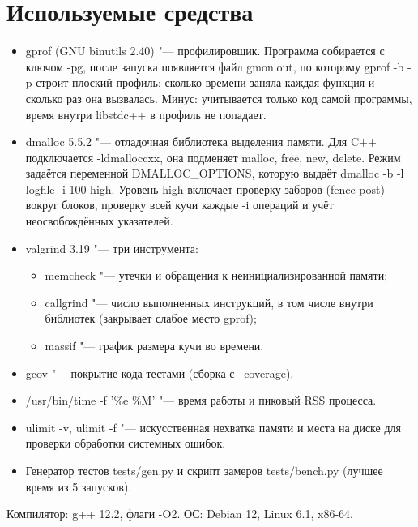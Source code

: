 \section{Используемые средства}

\begin{itemize}
\item {\ttfamily gprof} (GNU binutils 2.40) "--- профилировщик. Программа собирается с ключом
{\ttfamily -pg}, после запуска появляется файл {\ttfamily gmon.out}, по которому {\ttfamily gprof -b -p}
строит плоский профиль: сколько времени заняла каждая функция и сколько раз она вызвалась.
Минус: учитывается только код самой программы, время внутри {\ttfamily libstdc++} в профиль не попадает.
\item {\ttfamily dmalloc} 5.5.2 "--- отладочная библиотека выделения памяти. Для C++ подключается
{\ttfamily -ldmalloccxx}, она подменяет {\ttfamily malloc}, {\ttfamily free}, {\ttfamily new},
{\ttfamily delete}. Режим задаётся переменной {\ttfamily DMALLOC\_OPTIONS}, которую выдаёт
{\ttfamily dmalloc -b -l logfile -i 100 high}. Уровень {\ttfamily high} включает проверку заборов
(fence-post) вокруг блоков, проверку всей кучи каждые {\ttfamily -i} операций и учёт неосвобождённых
указателей.
\item {\ttfamily valgrind} 3.19 "--- три инструмента:
  \begin{itemize}
  \item {\ttfamily memcheck} "--- утечки и обращения к неинициализированной памяти;
  \item {\ttfamily callgrind} "--- число выполненных инструкций, в том числе внутри библиотек
  (закрывает слабое место {\ttfamily gprof});
  \item {\ttfamily massif} "--- график размера кучи во времени.
  \end{itemize}
\item {\ttfamily gcov} "--- покрытие кода тестами (сборка с {\ttfamily --coverage}).
\item {\ttfamily /usr/bin/time -f '\%e \%M'} "--- время работы и пиковый RSS процесса.
\item {\ttfamily ulimit -v}, {\ttfamily ulimit -f} "--- искусственная нехватка памяти и места на диске
для проверки обработки системных ошибок.
\item Генератор тестов {\ttfamily tests/gen.py} и скрипт замеров {\ttfamily tests/bench.py}
(лучшее время из 5 запусков).
\end{itemize}

Компилятор: {\ttfamily g++ 12.2}, флаги {\ttfamily -O2}. ОС: Debian 12, Linux 6.1, x86-64.

